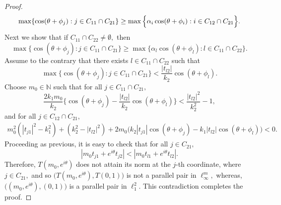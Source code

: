 \documentclass[10pt,a4paper]{amsart}
\begin{document}
\begin{proof}
\[\max\{\cos(\theta+\phi_j):j\in C_{11}\cap C_{21}\}\\
\geq \max\Big\{\alpha_i\cos(\theta+\phi_i):i\in C_{12}\cap C_{21}\Big\}.\]
Next we show that  if $C_{11}\cap C_{22}\neq \emptyset,$ then $$\max\{\cos(\theta+\phi_j):j\in C_{11}\cap C_{21}\}
\geq \max\Big\{\alpha_l\cos(\theta+\phi_l): l\in C_{11}\cap C_{22}\Big\}.$$ Assume to the contrary that there exists $l\in C_{11}\cap C_{22}$ such that 
\[\max\{\cos(\theta+\phi_j):j\in C_{11}\cap C_{21}\}<\frac{|t_{l2}|}{k_2}\cos(\theta+\phi_l).\]	
Choose $m_0\in \mathbb{N}$ such that for all $j\in C_{11}\cap C_{21},$
\[\frac{2k_1m_0}{k_2}\Big\{\cos(\theta+\phi_j)-\frac{|t_{l2}|}{k_2}\cos(\theta+\phi_l)\Big\}<\frac{|t_{l2}|^2}{k_2^2}-1,\]
and for all $j\in C_{12}\cap C_{21},$
\begin{eqnarray*}
	m_0^2(|t_{j1}|^2-k_1^2)+(k_2^2-|t_{l2}|^2)+2m_0\Big(k_2	|t_{j1}|\cos(\theta+\phi_j)-k_1|t_{l2}|\cos(\theta+\phi_l)\Big)<0.
\end{eqnarray*}
Proceeding as previous, it is easy to check that  for all $j\in C_{21},$
\[|m_0t_{j1}+e^{i\theta}t_{j2}|<|m_0t_{l1}+e^{i\theta}t_{l2}|.\]
Therefore, $T(m_0,e^{i\theta})$ does not attain its norm at the $j$-th coordinate, where $j\in C_{21},$ and so $\Big(T(m_0,e^{i\theta}),T(0,1)\Big)$ is not a parallel pair in $\ell_\infty^m,$ whereas, $\Big((m_0,e^{i\theta}),(0,1)\Big)$ is a parallel pair in $\ell_1^2.$ This contradiction completes the proof.

\end{proof}
\end{document}
